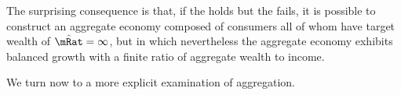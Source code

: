 \documentclass[BufferStockTheory]{subfiles}
\begin{document}
The surprising consequence is that, if the \GICAbs holds but the \GICNrm fails, it is possible to construct an aggregate economy composed of consumers all of whom have target wealth of $\Trg{\mRat}=\infty$, but in which nevertheless the aggregate economy exhibits balanced growth with a finite ratio of aggregate wealth to income.

We turn now to a more explicit examination of aggregation.


\begin{comment}
\subsubsection{Example Where There Is A Solution Without A Target}\label{subsubsec:FVACnotGIC}

To build intuition, it is useful to describe an example in which a nondegenerate solution exists but a target $\mTarg$ does not.  An example that satisfies the combination \FVAC~and~\cncl{\GICNrm} is depicted in Figure \ref{fig:FVACnotGIC}.  The consumption function is shown along with the $\Ex_{t}[\Delta \mRat_{t+1}]=0$ locus that identifies the `sustainable' level of spending at which $\mRat$ is expected to remain unchanged.  The diagram suggests a fact that is confirmed by deeper analysis: Under the depicted configuration of parameter values (see the code for details), the consumption function never reaches the $\Ex_{t}[\Delta \mRat_{t+1}]=0$ locus; indeed, when the \RIC~holds but the \GICNrm~does not, the consumption function's limiting slope $(1-\Pat/\Rfree)$ is shallower than that of the sustainable consumption locus $(1-\PGroAdj/\Rfree)$,\footnote{This is because $\Ex_{t}[\mRat_{t+1}]=\Ex_{t}[\Rnorm_{t+1}(\mRat_{t}-\cRat_{t})]+1$; solve $\mRat = (\mRat - \cRat)\Rnorm \InvEpShkInv^{-1}+1$ for $\cRat$ and differentiate.}  so the gap between the two \textit{increases} with $\mRat$ in the limit.  Although a nondegenerate consumption function exists, a target level of $\mRat$ does not (or, rather, the target is $\mRat=\infty$), because no matter how wealthy a consumer becomes, the consumer will always spend less than the amount that would keep $\mRat$ stable (in expectation).

\renewcommand{\figFile}{FVACnotGIC}
\hypertarget{\figFile}{}


\hypertarget{cGroLTpGro}{}




\end{comment}
\end{document}

